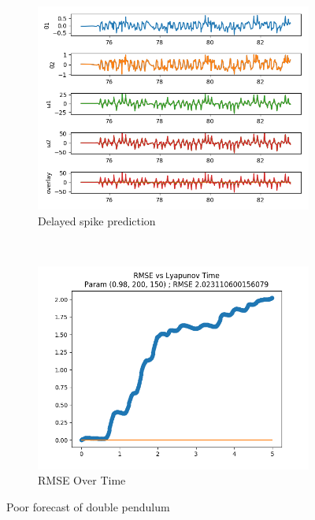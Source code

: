 \documentclass{article}
\begin{document}
\begin{figure}[H]
    \centering
    \begin{subfigure}[b]{0.45\textwidth}
        \includegraphics[width=\textwidth]{doc/paper/images/doub_pend/rank_2_param_305_fit.png}
        \caption{Delayed spike prediction}
    \end{subfigure}
    ~
    \begin{subfigure}[b]{0.45\textwidth}
        \includegraphics[width=\textwidth]{doc/paper/images/lorenz/rank_2_param_458_rmse.png}
        \caption{RMSE Over Time}
    \end{subfigure}
    \caption{Poor forecast of double pendulum}
\end{figure}
\end{document}

